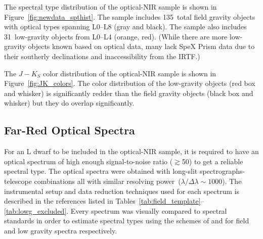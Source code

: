 \documentclass[12pt,preprint]{aastex}
\newcommand{\optNormal}{135}
\newcommand{\optLowG}{31}
\begin{document}
The spectral type distribution of the optical-NIR sample is shown in Figure~\ref{fig:newdata_spthist}.
The sample includes \optNormal~total field gravity objects with optical types spanning L0--L8 (gray and black).
The sample also includes \optLowG~low-gravity objects from L0--L4 (orange, red). 
(While there are more low-gravity objects known based on optical data, many lack SpeX Prism data due to their southerly declinations and inaccessibility from the IRTF.)

The $J-K_S$ color distribution of the optical-NIR sample is shown in Figure~\ref{fig:JK_colors}. 
The color distribution of the low-gravity objects (red box and whisker) is significantly redder than the field gravity objects (black box and whisker) but they do overlap significantly.

\subsection{Far-Red Optical Spectra}



For an L dwarf to be included in the optical-NIR sample, it is required to have an optical spectrum of high enough signal-to-noise ratio ($\gtrsim$50) to get a reliable spectral type.
The optical spectra were obtained with long-slit spectrographs-telescope combinations all with similar resolving power~($\lambda/\Delta\lambda\sim1000$). 
The instrumental setup and data reduction techniques used for each spectrum is described in the references listed in Tables~\ref{tab:field_template}--\ref{tab:lowg_excluded}.
Every spectrum was visually compared to spectral standards in order to estimate spectral types using the schemes of \citet{K99} and \cite{Cruz09_lowg} for field and low gravity spectra respectively.  

\end{document}
